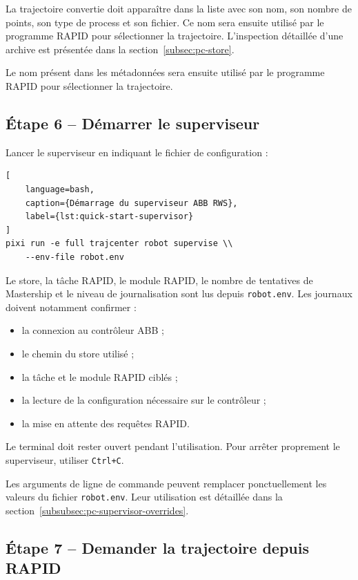 \documentclass{rapportENSAM}
\begin{document}
La trajectoire convertie doit apparaître dans la liste avec son nom, son nombre de points, son type de process et son fichier. Ce nom sera ensuite utilisé par le programme RAPID pour sélectionner la trajectoire. L'inspection détaillée d'une archive est présentée dans la section~\ref{subsec:pc-store}.

Le nom présent dans les métadonnées sera ensuite utilisé par le programme RAPID pour sélectionner la trajectoire.

\subsection{Étape 6 -- Démarrer le superviseur}
\label{subsec:quick-start-supervisor}

Lancer le superviseur en indiquant le fichier de configuration :

\begin{lstlisting}[
    language=bash,
    caption={Démarrage du superviseur ABB RWS},
    label={lst:quick-start-supervisor}
]
pixi run -e full trajcenter robot supervise \\
    --env-file robot.env
\end{lstlisting}

Le store, la tâche RAPID, le module RAPID, le nombre de tentatives de Mastership et le niveau de journalisation sont lus depuis
\texttt{robot.env}. Les journaux doivent notamment confirmer :

\begin{itemize}
    \item la connexion au contrôleur ABB ;
    \item le chemin du store utilisé ;
    \item la tâche et le module RAPID ciblés ;
    \item la lecture de la configuration nécessaire sur le contrôleur ;
    \item la mise en attente des requêtes RAPID.
\end{itemize}

Le terminal doit rester ouvert pendant l'utilisation. Pour arrêter proprement le superviseur, utiliser \texttt{Ctrl+C}.

Les arguments de ligne de commande peuvent remplacer ponctuellement les valeurs du fichier \texttt{robot.env}. Leur utilisation est détaillée dans la section~\ref{subsubsec:pc-supervisor-overrides}.


\subsection{Étape 7 -- Demander la trajectoire depuis RAPID}
\label{subsec:quick-start-rapid-request}
\end{document}

